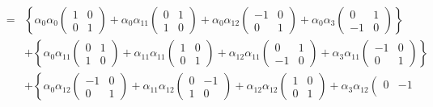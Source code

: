 \documentclass[aps,preprint]{revtex4}
\begin{document}
\begin{eqnarray}
&=&\left\{ \alpha _{0}\alpha _{0}\left( 
\begin{array}{cc}
1 & 0 \\ 
0 & 1%
\end{array}%
\right) +\alpha _{0}\alpha _{11}\left( 
\begin{array}{cc}
0 & 1 \\ 
1 & 0%
\end{array}%
\right) +\alpha _{0}\alpha _{12}\left( 
\begin{array}{cc}
-1 & 0 \\ 
0 & 1%
\end{array}%
\right) +\alpha _{0}\alpha _{3}\left( 
\begin{array}{cc}
0 & 1 \\ 
-1 & 0%
\end{array}%
\right) \right\} \\
&&+\left\{ \alpha _{0}\alpha _{11}\left( 
\begin{array}{cc}
0 & 1 \\ 
1 & 0%
\end{array}%
\right) +\alpha _{11}\alpha _{11}\left( 
\begin{array}{cc}
1 & 0 \\ 
0 & 1%
\end{array}%
\right) +\alpha _{12}\alpha _{11}\left( 
\begin{array}{cc}
0 & 1 \\ 
-1 & 0%
\end{array}%
\right) +\alpha _{3}\alpha _{11}\left( 
\begin{array}{cc}
-1 & 0 \\ 
0 & 1%
\end{array}%
\right) \right\} \\
&&+\left\{ \alpha _{0}\alpha _{12}\left( 
\begin{array}{cc}
-1 & 0 \\ 
0 & 1%
\end{array}%
\right) +\alpha _{11}\alpha _{12}\left( 
\begin{array}{cc}
0 & -1 \\ 
1 & 0%
\end{array}%
\right) +\alpha _{12}\alpha _{12}\left( 
\begin{array}{cc}
1 & 0 \\ 
0 & 1%
\end{array}%
\right) +\alpha _{3}\alpha _{12}\left( 
\begin{array}{cc}
0 & -1 \\ 

\end{array}
\end{eqnarray}
\end{document}
